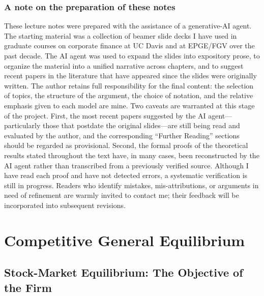 \documentclass[11pt,a4paper,oneside]{book}
\theoremstyle{plain}
\theoremstyle{definition}
\theoremstyle{remark}
\numberwithin{equation}{chapter}
\begin{document}
\section*{A note on the preparation of these notes}
These lecture notes were prepared with the assistance of a generative-AI agent.
The starting material was a collection of beamer slide decks I have used in graduate courses on corporate finance at UC Davis and at EPGE/FGV over the past decade.
The AI agent was used to expand the slides into expository prose, to organize the material into a unified narrative across chapters, and to suggest recent papers in the literature that have appeared since the slides were originally written.
The author retains full responsibility for the final content: the selection of topics, the structure of the argument, the choice of notation, and the relative emphasis given to each model are mine.
Two caveats are warranted at this stage of the project.
First, the most recent papers suggested by the AI agent---particularly those that postdate the original slides---are still being read and evaluated by the author, and the corresponding ``Further Reading'' sections should be regarded as provisional.
Second, the formal proofs of the theoretical results stated throughout the text have, in many cases, been reconstructed by the AI agent rather than transcribed from a previously verified source.
Although I have read each proof and have not detected errors, a systematic verification is still in progress.
Readers who identify mistakes, mis-attributions, or arguments in need of refinement are warmly invited to contact me; their feedback will be incorporated into subsequent revisions.

\tableofcontents

\mainmatter


\part{Competitive General Equilibrium}


\chapter{Stock-Market Equilibrium: The Objective of the Firm}
\label{ch:objective}
\end{document}
